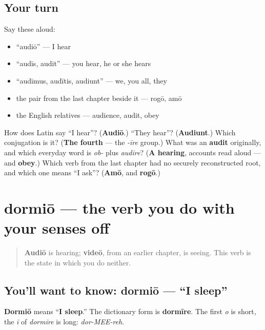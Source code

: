\subsection*{Your turn}
Say these aloud:

\begin{itemize}
\raggedright
  \item \textquotedblleft{}audiō\textquotedblright{} — I hear
  \item \textquotedblleft{}audīs, audit\textquotedblright{} — you hear, he or she hears
  \item \textquotedblleft{}audīmus, audītis, audiunt\textquotedblright{} — we, you all, they
  \item the pair from the last chapter beside it — rogō, amō
  \item the English relatives — audience, audit, obey
\end{itemize}

\begin{tcolorbox}[breakable,colback=teal!4,colframe=teal!35!black,title={Before you move on}]
How does Latin say \textquotedblleft{}I hear\textquotedblright{}? (\textbf{Audiō}.) \textquotedblleft{}They hear\textquotedblright{}? (\textbf{Audiunt}.) Which conjugation is it? (\textbf{The fourth} — the \emph{-īre} group.) What was an \textbf{audit} originally, and which everyday word is \emph{ob-} plus \emph{audīre}? (\textbf{A hearing}, accounts read aloud — and \textbf{obey}.) Which verb from the last chapter had no securely reconstructed root, and which one means \textquotedblleft{}I ask\textquotedblright{}? (\textbf{Amō}, and \textbf{rogō}.)
\end{tcolorbox}
\section[dormiō, dormīre]{dormiō — the verb you do with your senses off}

\label{lesson:LA-C40-dormio}



\begin{quote}
\textbf{Audiō} is hearing; \textbf{videō}, from an earlier chapter, is seeing. This verb is the state in which you do neither.
\end{quote}

\subsection*{You'll want to know: dormiō — \textquotedblleft{}I sleep\textquotedblright{}}
\textbf{Dormiō} means \textquotedblleft{}\textbf{I sleep}.\textquotedblright{} The dictionary form is \textbf{dormīre}. The first \emph{o} is short, the \emph{ī} of \emph{dormīre} is long: \emph{dor-MEE-reh}.

